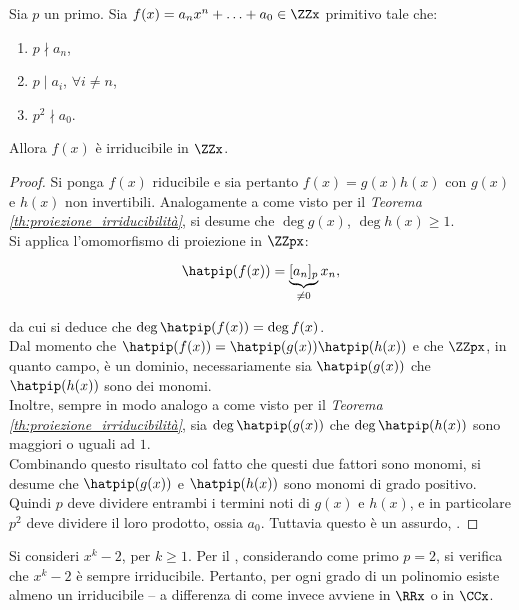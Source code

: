 \begin{theorem}
    \label{th:eisenstein}
    Sia $p$ un primo.
    Sia $f(x) = a_n x^n + \ldots + a_0 \in \ZZx$ primitivo tale che:

    \begin{enumerate}[ (1)]
        \item $p \nmid a_n$,
        \item $p \mid a_i$, $\forall i \neq n$,
        \item $p^2 \nmid a_0$.
    \end{enumerate}

    Allora $f(x)$ è irriducibile in $\ZZx$.
\end{theorem}

\begin{proof}
    Si ponga $f(x)$ riducibile e sia pertanto $f(x)=g(x)h(x)$ con
    $g(x)$ e $h(x)$ non invertibili. Analogamente a come visto
    per il \textit{Teorema \ref{th:proiezione_irriducibilità}}, si
    desume che $\deg g(x)$, $\deg h(x) \geq 1$. \\

    Si applica l'omomorfismo di proiezione in $\ZZpx$:

    \[ \hatpip(f(x))=\underbrace{[a_n]_p}_{\neq 0} x_n, \]

    da cui si deduce che $\deg \hatpip(f(x)) = \deg f(x)$. \\

    Dal momento che $\hatpip(f(x))=\hatpip(g(x))\hatpip(h(x))$ e
    che $\ZZpx$, in quanto campo, è un dominio,
    necessariamente sia $\hatpip(g(x))$ che $\hatpip(h(x))$
    sono dei monomi. \\

    Inoltre, sempre in modo analogo a come visto per il \textit{Teorema
        \ref{th:proiezione_irriducibilità}}, sia $\deg \hatpip(g(x))$
    che $\deg \hatpip(h(x))$ sono maggiori o uguali ad $1$. \\

    Combinando questo risultato col fatto che questi due fattori
    sono monomi, si desume che
    $\hatpip(g(x))$ e $\hatpip(h(x))$ sono monomi di grado positivo.
    Quindi $p$ deve dividere entrambi i termini noti di $g(x)$ e
    $h(x)$, e in particolare $p^2$ deve dividere il loro prodotto,
    ossia $a_0$. Tuttavia questo è un assurdo, \Lightning{}.
\end{proof}

\begin{remark*}
    Si consideri $x^k-2$, per $k \geq 1$.
    Per il ,
    considerando come primo $p=2$, si verifica che
    $x^k-2$ è sempre irriducibile. Pertanto, per ogni
    grado di un polinomio esiste almeno un irriducibile --
    a differenza di come invece avviene in $\RRx$ o in $\CCx$.
\end{remark*}

